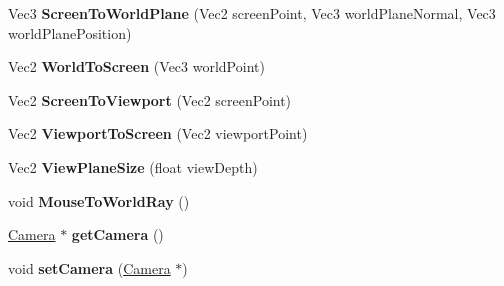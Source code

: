 \begin{DoxyCompactItemize}
\item 
\hypertarget{classDCEngine_1_1Components_1_1CameraViewport_aa2be09af689ec4f3178cdc6accc239a3}{Vec3 {\bfseries Screen\-To\-World\-Plane} (Vec2 screen\-Point, Vec3 world\-Plane\-Normal, Vec3 world\-Plane\-Position)}\label{classDCEngine_1_1Components_1_1CameraViewport_aa2be09af689ec4f3178cdc6accc239a3}

\item 
\hypertarget{classDCEngine_1_1Components_1_1CameraViewport_a6416529a0e2235adf226b66fa477cb14}{Vec2 {\bfseries World\-To\-Screen} (Vec3 world\-Point)}\label{classDCEngine_1_1Components_1_1CameraViewport_a6416529a0e2235adf226b66fa477cb14}

\item 
\hypertarget{classDCEngine_1_1Components_1_1CameraViewport_aa21d22aca81f471a9696b233c7834d30}{Vec2 {\bfseries Screen\-To\-Viewport} (Vec2 screen\-Point)}\label{classDCEngine_1_1Components_1_1CameraViewport_aa21d22aca81f471a9696b233c7834d30}

\item 
\hypertarget{classDCEngine_1_1Components_1_1CameraViewport_a7be339464783bef7306a05e7eea875e4}{Vec2 {\bfseries Viewport\-To\-Screen} (Vec2 viewport\-Point)}\label{classDCEngine_1_1Components_1_1CameraViewport_a7be339464783bef7306a05e7eea875e4}

\item 
\hypertarget{classDCEngine_1_1Components_1_1CameraViewport_a6dd86f887cb68a8d1a9a57f3cd98613d}{Vec2 {\bfseries View\-Plane\-Size} (float view\-Depth)}\label{classDCEngine_1_1Components_1_1CameraViewport_a6dd86f887cb68a8d1a9a57f3cd98613d}

\item 
\hypertarget{classDCEngine_1_1Components_1_1CameraViewport_a4815cd94f2715bcd5272fd0ef1c49bf6}{void {\bfseries Mouse\-To\-World\-Ray} ()}\label{classDCEngine_1_1Components_1_1CameraViewport_a4815cd94f2715bcd5272fd0ef1c49bf6}

\item 
\hypertarget{classDCEngine_1_1Components_1_1CameraViewport_aafac023155202966a6329a9ba6ddddce}{\hyperlink{classDCEngine_1_1Components_1_1Camera}{Camera} $\ast$ {\bfseries get\-Camera} ()}\label{classDCEngine_1_1Components_1_1CameraViewport_aafac023155202966a6329a9ba6ddddce}

\item 
\hypertarget{classDCEngine_1_1Components_1_1CameraViewport_af6d4d6d36b56b234e3cad415e0d6b1bc}{void {\bfseries set\-Camera} (\hyperlink{classDCEngine_1_1Components_1_1Camera}{Camera} $\ast$)}\label{classDCEngine_1_1Components_1_1CameraViewport_af6d4d6d36b56b234e3cad415e0d6b1bc}


\end{DoxyCompactItemize}
